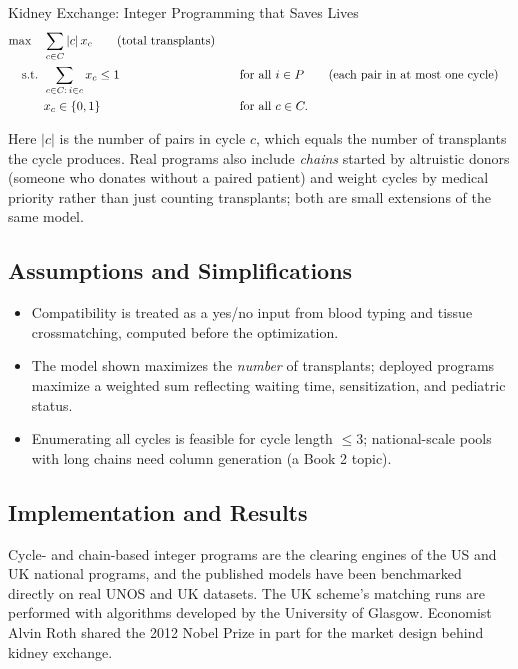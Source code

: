 \begin{casestudybox}{Kidney Exchange: Integer Programming that Saves Lives}
\begin{align*}
\max \quad & \sum_{c \in C} |c| \, x_c   \tag{total transplants} \\
\mbox{ s.t. }        & \sum_{c \in C :\, i \in c} x_c \leq 1 &&\quad \mbox{for all } i \in P   \tag{each pair in at most one cycle} \\
             & x_c \in \{0,1\} &&\quad \mbox{for all } c \in C.
\end{align*}

Here $|c|$ is the number of pairs in cycle $c$, which equals the number of transplants the cycle produces.  Real programs also include \emph{chains} started by altruistic donors (someone who donates without a paired patient) and weight cycles by medical priority rather than just counting transplants; both are small extensions of the same model.

\subsection*{Assumptions and Simplifications}
\begin{itemize}
\item Compatibility is treated as a yes/no input from blood typing and tissue crossmatching, computed before the optimization.
\item The model shown maximizes the \emph{number} of transplants; deployed programs maximize a weighted sum reflecting waiting time, sensitization, and pediatric status.
\item Enumerating all cycles is feasible for cycle length $\le 3$; national-scale pools with long chains need column generation (a Book 2 topic).
\end{itemize}

\subsection*{Implementation and Results}
Cycle- and chain-based integer programs are the clearing engines of the US and UK national programs, and the published models have been benchmarked directly on real UNOS and UK datasets.  The UK scheme's matching runs are performed with algorithms developed by the University of Glasgow.  Economist Alvin Roth shared the 2012 Nobel Prize in part for the market design behind kidney exchange.


\end{casestudybox}
